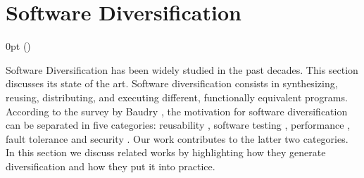 \section{Software Diversification  }
\label{sota:sota}
\def\checkmark{\tikz\fill[scale=0.4](0,.35) -- (.25,0) -- (1,.7) -- (.25,.15) -- cycle;} 

  {\topsep}%
  {\topsep}%
  {\itshape}%
  {0pt}%
  {\bfseries}%
  {}%
  { }%
  {()\textnormal{}}

\def\Gnospace~{G{}}
\theoremstyle{sota}
\newtheorem{goal}{G}
\providecommand*{\definitionautorefname}{\Gnospace}
\newcommand{\goalautorefname}{\Gnospace}


\def\Snospace~{S{}}
\theoremstyle{sota}
\newtheorem{strategy}{S}
\providecommand*{\definitionautorefname}{\Snospace}
\newcommand{\strategyautorefname}{\Snospace}

\def\Unospace~{U{}}
\theoremstyle{sota}
\newtheorem{usage}{U}
\providecommand*{\definitionautorefname}{\Unospace}
\newcommand{\usageautorefname}{\Unospace}









Software Diversification has been widely studied in the past decades. This section discusses its state of the art.
Software diversification consists in synthesizing, reusing, distributing, and executing different, functionally equivalent programs. 
According to the survey by Baudry \etal \cite{natural_diversity}, the motivation for software diversification can be separated in five categories: reusability \cite{pohl2005software}, software testing \cite{Chen2010AdaptiveRT}, performance \cite{10.1145/2025113.2025133}, fault tolerance \cite{1659219} and security \cite{cohen1993operating}. Our work contributes to the latter two categories. In this section we discuss related works by highlighting how they generate diversification and how they put it into practice. 

